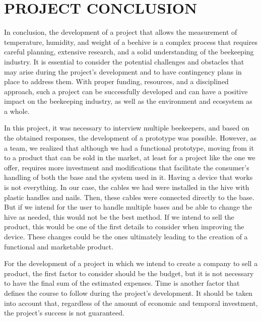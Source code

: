 \documentclass[12pt]{report}
\begin{document}
	
	\chapter{PROJECT CONCLUSION}
	In conclusion, the development of a project that allows the measurement of temperature, humidity, and weight of a beehive is a complex process that requires careful planning, extensive research, and a solid understanding of the beekeeping industry. It is essential to consider the potential challenges and obstacles that may arise during the project's development and to have contingency plans in place to address them. With proper funding, resources, and a disciplined approach, such a project can be successfully developed and can have a positive impact on the beekeeping industry, as well as the environment and ecosystem as a whole.
	
	\par In this project, it was necessary to interview multiple beekeepers, and based on the obtained responses, the development of a prototype was possible. However, as a team, we realized that although we had a functional prototype, moving from it to a product that can be sold in the market, at least for a project like the one we offer, requires more investment and modifications that facilitate the consumer's handling of both the base and the system used in it. Having a device that works is not everything. In our case, the cables we had were installed in the hive with plastic handles and nails. Then, these cables were connected directly to the base. But if we intend for the user to handle multiple bases and be able to change the hive as needed, this would not be the best method. If we intend to sell the product, this would be one of the first details to consider when improving the device. These changes could be the ones ultimately leading to the creation of a functional and marketable product.
	
	\par For the development of a project in which we intend to create a company to sell a product, the first factor to consider should be the budget, but it is not necessary to have the final sum of the estimated expenses. Time is another factor that defines the course to follow during the project's development. It should be taken into account that, regardless of the amount of economic and temporal investment, the project's success is not guaranteed.
	
\end{document}

